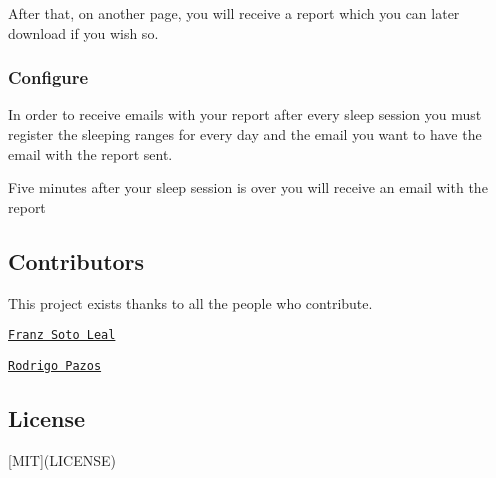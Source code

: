After that, on another page, you will receive a report which you can later download if you wish so.



\subsubsection*{Configure}

In order to receive emails with your report after every sleep session you must register the sleeping ranges for every day and the email you want to have the email with the report sent.



Five minutes after your sleep session is over you will receive an email with the report



\subsection*{Contributors}

This project exists thanks to all the people who contribute.
\begin{DoxyItemize}
\item \href{https://github.com/FranzSL}{\tt Franz Soto Leal}
\item \href{https://github.com/ropa1998}{\tt Rodrigo Pazos}
\end{DoxyItemize}

\subsection*{License}

\mbox{[}M\+IT\mbox{]}(L\+I\+C\+E\+N\+SE) 